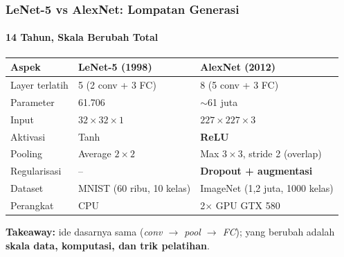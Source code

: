 \documentclass[t,aspectratio=169,xcolor=dvipsnames]{beamer}
\begin{document}
\begin{frame}
    \frametitle{LeNet-5 vs AlexNet: Lompatan Generasi}
    \framesubtitle{14 Tahun, Skala Berubah Total}
    \footnotesize
    \vspace{4pt}
    \begin{center}
    \begin{tabular}{lll}
        \toprule
        \textbf{Aspek} & \textbf{LeNet-5 (1998)} & \textbf{AlexNet (2012)} \\
        \midrule
        Layer terlatih & 5 (2 conv + 3 FC) & 8 (5 conv + 3 FC) \\
        Parameter & 61.706 & $\sim$61 juta \\
        Input & $32\times32\times1$ & $227\times227\times3$ \\
        Aktivasi & Tanh & \textbf{ReLU} \\
        Pooling & Average $2\times2$ & Max $3\times3$, stride 2 (overlap) \\
        Regularisasi & -- & \textbf{Dropout + augmentasi} \\
        Dataset & MNIST (60 ribu, 10 kelas) & ImageNet (1,2 juta, 1000 kelas) \\
        Perangkat & CPU & 2$\times$ GPU GTX 580 \\
        \bottomrule
    \end{tabular}
    \end{center}
    \vspace{0.2cm}
    \textbf{Takeaway:} ide dasarnya sama (\textit{conv $\to$ pool $\to$ FC}); yang berubah adalah \textbf{skala data, komputasi, dan trik pelatihan}.
\end{frame}
\end{document}
